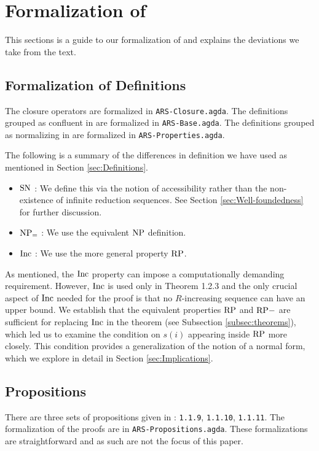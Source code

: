 \section{Formalization of \terese}
\label{sec:Formalization}
This sections is a guide to our formalization of \terese and explains the deviations we take from the text.  

\subsection{Formalization of Definitions}\label{subsec:def}
The closure operators are formalized in \texttt{ARS-Closure.agda}. 
The definitions grouped as confluent in \terese are formalized in \texttt{ARS-Base.agda}. 
The definitions grouped as normalizing in \terese are formalized in \texttt{ARS-Properties.agda}.  

The following is a summary of the differences in definition we have used as mentioned in Section \ref{sec:Definitions}. 
\begin{itemize}
    \item $\mathrm{SN}$ : We define this via the notion of accessibility rather than the non-existence of infinite reduction sequences. 
     See Section \ref{sec:Well-foundedness} for further discussion.
    \item $\mathrm{NP_=}$ : We use the equivalent $\mathrm{NP}$ definition. 
    \item $\mathrm{Inc}$ : We use the more general property $\mathrm{RP}$.      
\end{itemize}

As mentioned, the $\mathrm{Inc}$ property can impose a computationally demanding requirement. However, $\mathrm{Inc}$ is used only in Theorem 1.2.3 
and the only crucial aspect of $\mathrm{Inc}$ needed for the proof is that no $R$-increasing 
sequence can have an upper bound.
We establish that the equivalent properties $\mathrm{RP}$ and $\mathrm{RP{-}}$ are sufficient for replacing $\mathrm{Inc}$ in the theorem (see Subsection \ref{subsec:theorems}), 
which led us to examine the condition on $s (i)$ appearing inside $\mathrm{RP}$ more closely. This condition provides a generalization of the notion of a normal form, 
which we explore in detail in Section \ref{sec:Implications}. 

\subsection{Propositions}
There are three sets of propositions given in \terese: \texttt{1.1.9}, \texttt{1.1.10}, \texttt{1.1.11}. 
The formalization of the proofs are in \texttt{ARS-Propositions.agda}. These formalizations are straightforward 
and as such are not the focus of this paper. 


